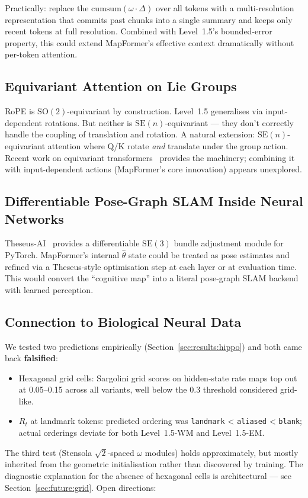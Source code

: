 Practically: replace the $\mathrm{cumsum}(\omega \cdot \Delta)$ over all
tokens with a multi-resolution representation that commits past chunks
into a single summary and keeps only recent tokens at full resolution.
Combined with Level~1.5's bounded-error property, this could extend
MapFormer's effective context dramatically without per-token attention.

\subsection{Equivariant Attention on Lie Groups}

RoPE is $\mathrm{SO}(2)$-equivariant by construction. Level~1.5
generalises via input-dependent rotations. But neither is
$\mathrm{SE}(n)$-equivariant --- they don't correctly handle the
coupling of translation and rotation. A natural extension:
$\mathrm{SE}(n)$-equivariant attention where Q/K rotate \emph{and}
translate under the group action. Recent work on equivariant
transformers~\citep{finzi2021practical} provides the machinery;
combining it with input-dependent actions (MapFormer's core innovation)
appears unexplored.

\subsection{Differentiable Pose-Graph SLAM Inside Neural Networks}

Theseus-AI~\citep{pineda2022theseus} provides a differentiable
$\mathrm{SE}(3)$ bundle adjustment module for PyTorch. MapFormer's
internal $\hat\theta$ state could be treated as pose estimates and
refined via a Theseus-style optimisation step at each layer or at
evaluation time. This would convert the ``cognitive map'' into a
literal pose-graph SLAM backend with learned perception.

\subsection{Connection to Biological Neural Data}
\label{sec:future:bio}

We tested two predictions empirically
(Section~\ref{sec:results:hippo}) and both came back \textbf{falsified}:
\begin{itemize}
  \item Hexagonal grid cells: Sargolini grid scores on hidden-state
  rate maps top out at 0.05--0.15 across all variants, well below the
  0.3 threshold considered grid-like.
  \item $R_t$ at landmark tokens: predicted ordering was
  \texttt{landmark} < \texttt{aliased} < \texttt{blank}; actual
  orderings deviate for both Level~1.5-WM and Level~1.5-EM.
\end{itemize}
The third test (Stensola $\sqrt{2}$-spaced $\omega$ modules) holds
approximately, but mostly inherited from the geometric initialisation
rather than discovered by training. The diagnostic explanation for the
absence of hexagonal cells is architectural --- see
Section~\ref{sec:future:grid}. Open directions:

